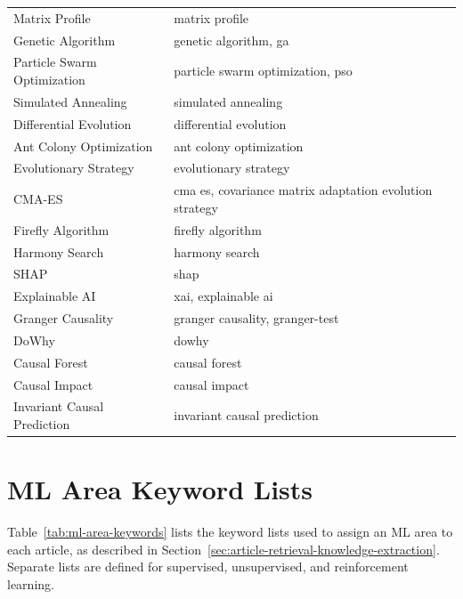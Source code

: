 \begin{xltabular}{\textwidth}{lX}
Matrix Profile & matrix profile \\
\addlinespace
Genetic Algorithm & genetic algorithm, ga \\
Particle Swarm Optimization & particle swarm optimization, pso \\
Simulated Annealing & simulated annealing \\
Differential Evolution & differential evolution \\
Ant Colony Optimization & ant colony optimization \\
Evolutionary Strategy & evolutionary strategy \\
CMA-ES & cma es, covariance matrix adaptation evolution strategy \\
Firefly Algorithm & firefly algorithm \\
Harmony Search & harmony search \\
\addlinespace
SHAP & shap \\
Explainable AI & xai, explainable ai \\
\addlinespace
Granger Causality & granger causality, granger-test \\
DoWhy & dowhy \\
Causal Forest & causal forest \\
Causal Impact & causal impact \\
Invariant Causal Prediction & invariant causal prediction \\
\end{xltabular}



\chapter{ML Area Keyword Lists}
\label{app:ml-area-keywords}

Table~\ref{tab:ml-area-keywords} lists the keyword lists used to
assign an ML area to each article, as described in
Section~\ref{sec:article-retrieval-knowledge-extraction}. Separate
lists are defined for supervised, unsupervised, and reinforcement
learning. 

